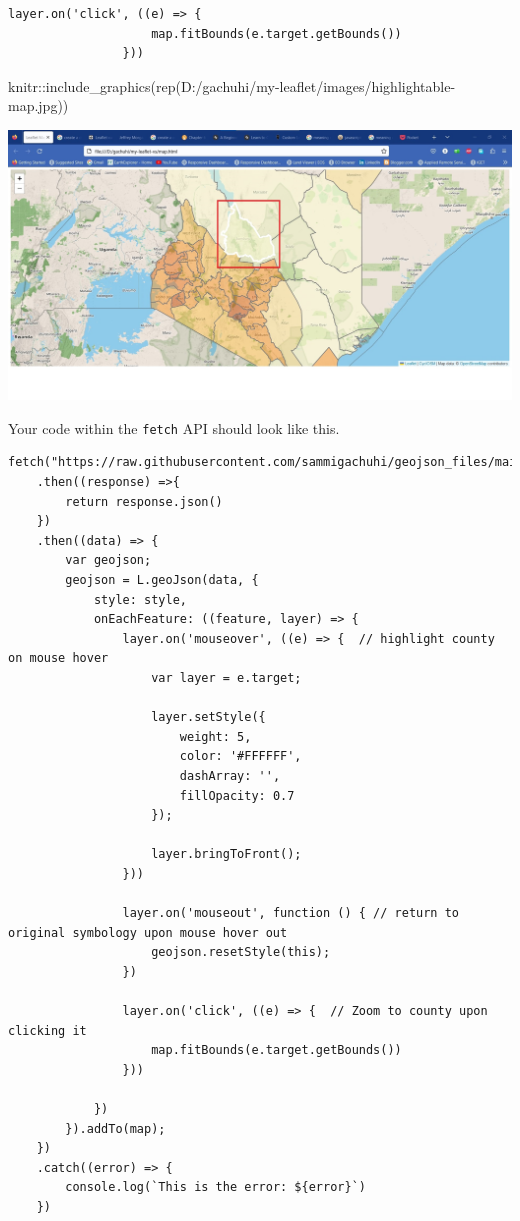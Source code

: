 \documentclass[
]{book}
\newenvironment{Shaded}{\begin{snugshade}}{\end{snugshade}}
\newcommand{\FunctionTok}[1]{\textcolor[rgb]{0.00,0.00,0.00}{#1}}
\newcommand{\NormalTok}[1]{#1}
\newcommand{\SpecialCharTok}[1]{\textcolor[rgb]{0.00,0.00,0.00}{#1}}
\newcommand{\StringTok}[1]{\textcolor[rgb]{0.31,0.60,0.02}{#1}}
\begin{document}
\begin{verbatim}
layer.on('click', ((e) => {
                    map.fitBounds(e.target.getBounds())
                }))
\end{verbatim}

\begin{Shaded}
\begin{Highlighting}[]
\NormalTok{knitr}\SpecialCharTok{::}\FunctionTok{include\_graphics}\NormalTok{(}\FunctionTok{rep}\NormalTok{(}\StringTok{\textquotesingle{}D:/gachuhi/my{-}leaflet/images/highlightable{-}map.jpg\textquotesingle{}}\NormalTok{))}
\end{Highlighting}
\end{Shaded}

\includegraphics[width=26.67in]{../images/highlightable-map}

Your code within the \texttt{fetch} API should look like this.

\begin{verbatim}
fetch("https://raw.githubusercontent.com/sammigachuhi/geojson_files/main/counties_json.json")
    .then((response) =>{
        return response.json()
    })
    .then((data) => {
        var geojson;
        geojson = L.geoJson(data, {
            style: style,
            onEachFeature: ((feature, layer) => {
                layer.on('mouseover', ((e) => {  // highlight county on mouse hover
                    var layer = e.target;
                
                    layer.setStyle({
                        weight: 5,
                        color: '#FFFFFF',
                        dashArray: '',
                        fillOpacity: 0.7
                    });
                
                    layer.bringToFront();
                }))

                layer.on('mouseout', function () { // return to original symbology upon mouse hover out
                    geojson.resetStyle(this);
                })

                layer.on('click', ((e) => {  // Zoom to county upon clicking it
                    map.fitBounds(e.target.getBounds())
                }))

            })
        }).addTo(map);
    })
    .catch((error) => {
        console.log(`This is the error: ${error}`)
    })
\end{verbatim}
\end{document}
